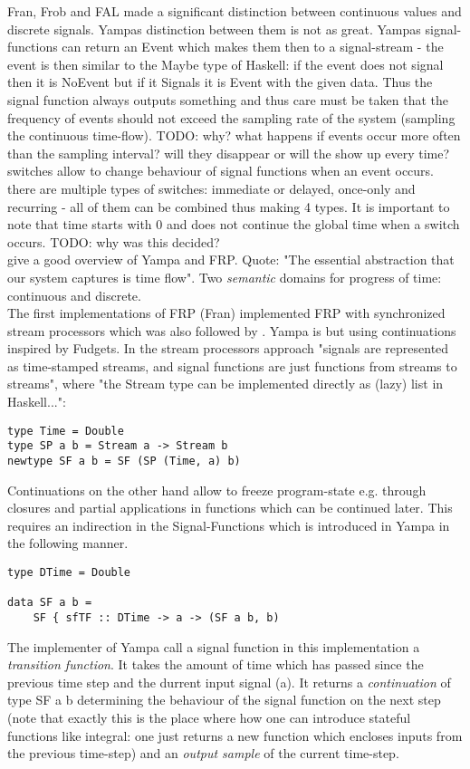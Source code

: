 Fran, Frob and FAL made a significant distinction between continuous values and discrete signals. Yampas distinction between them is not as great. Yampas signal-functions can return an Event which makes them then to a signal-stream - the event is then similar to the Maybe type of Haskell: if the event does not signal then it is NoEvent but if it Signals it is Event with the given data. Thus the signal function always outputs something and thus care must be taken that the frequency of events should not exceed the sampling rate of the system (sampling the continuous time-flow). TODO: why? what happens if events occur more often than the sampling interval? will they disappear or will the show up every time? \\

switches allow to change behaviour of signal functions when an event occurs. there are multiple types of switches: immediate or delayed, once-only and recurring - all of them can be combined thus making 4 types. It is important to note that time starts with 0 and does not continue the global time when a switch occurs. TODO: why was this decided? \\

\cite{Nilsson2002} give a good overview of Yampa and FRP. Quote: "The essential abstraction that our system captures is time flow". Two \textit{semantic} domains for progress of time: continuous and discrete. \\

The first implementations of FRP (Fran) implemented FRP with synchronized stream processors which was also followed by \cite{Wan2000}. Yampa is but using continuations inspired by Fudgets. In the stream processors approach "signals are represented as time-stamped streams, and signal functions are just functions from streams to streams", where "the Stream type can be implemented directly as (lazy) list in Haskell...":
\begin{lstlisting}[frame=single]
type Time = Double
type SP a b = Stream a -> Stream b
newtype SF a b = SF (SP (Time, a) b)
\end{lstlisting}
Continuations on the other hand allow to freeze program-state e.g. through closures and partial applications in functions which can be continued later. This requires an indirection in the Signal-Functions which is introduced in Yampa in the following manner. 
\begin{lstlisting}[frame=single]
type DTime = Double

data SF a b = 
	SF { sfTF :: DTime -> a -> (SF a b, b)
\end{lstlisting}
The implementer of Yampa call a signal function in this implementation a \textit{transition function}. It takes the amount of time which has passed since the previous time step and the durrent input signal (a). It returns a \textit{continuation} of type SF a b determining the behaviour of the signal function on the next step (note that exactly this is the place where how one can introduce stateful functions like integral: one just returns a new function which encloses inputs from the previous time-step) and an \textit{output sample} of the current time-step. \\

